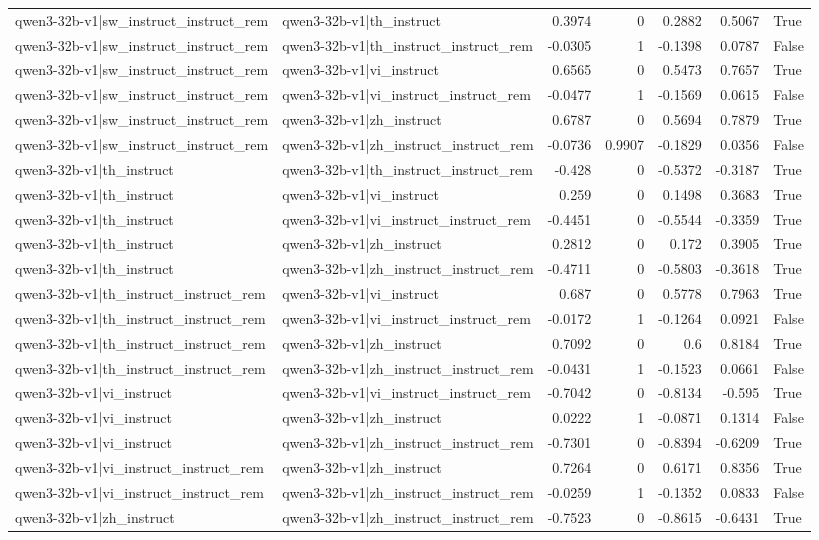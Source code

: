 \begin{table}
\begin{tabular}{l l r r r r l}
qwen3-32b-v1|sw_instruct_instruct_rem & qwen3-32b-v1|th_instruct & 0.3974 & 0 & 0.2882 & 0.5067 & True \\
qwen3-32b-v1|sw_instruct_instruct_rem & qwen3-32b-v1|th_instruct_instruct_rem & -0.0305 & 1 & -0.1398 & 0.0787 & False \\
qwen3-32b-v1|sw_instruct_instruct_rem & qwen3-32b-v1|vi_instruct & 0.6565 & 0 & 0.5473 & 0.7657 & True \\
qwen3-32b-v1|sw_instruct_instruct_rem & qwen3-32b-v1|vi_instruct_instruct_rem & -0.0477 & 1 & -0.1569 & 0.0615 & False \\
qwen3-32b-v1|sw_instruct_instruct_rem & qwen3-32b-v1|zh_instruct & 0.6787 & 0 & 0.5694 & 0.7879 & True \\
qwen3-32b-v1|sw_instruct_instruct_rem & qwen3-32b-v1|zh_instruct_instruct_rem & -0.0736 & 0.9907 & -0.1829 & 0.0356 & False \\
qwen3-32b-v1|th_instruct & qwen3-32b-v1|th_instruct_instruct_rem & -0.428 & 0 & -0.5372 & -0.3187 & True \\
qwen3-32b-v1|th_instruct & qwen3-32b-v1|vi_instruct & 0.259 & 0 & 0.1498 & 0.3683 & True \\
qwen3-32b-v1|th_instruct & qwen3-32b-v1|vi_instruct_instruct_rem & -0.4451 & 0 & -0.5544 & -0.3359 & True \\
qwen3-32b-v1|th_instruct & qwen3-32b-v1|zh_instruct & 0.2812 & 0 & 0.172 & 0.3905 & True \\
qwen3-32b-v1|th_instruct & qwen3-32b-v1|zh_instruct_instruct_rem & -0.4711 & 0 & -0.5803 & -0.3618 & True \\
qwen3-32b-v1|th_instruct_instruct_rem & qwen3-32b-v1|vi_instruct & 0.687 & 0 & 0.5778 & 0.7963 & True \\
qwen3-32b-v1|th_instruct_instruct_rem & qwen3-32b-v1|vi_instruct_instruct_rem & -0.0172 & 1 & -0.1264 & 0.0921 & False \\
qwen3-32b-v1|th_instruct_instruct_rem & qwen3-32b-v1|zh_instruct & 0.7092 & 0 & 0.6 & 0.8184 & True \\
qwen3-32b-v1|th_instruct_instruct_rem & qwen3-32b-v1|zh_instruct_instruct_rem & -0.0431 & 1 & -0.1523 & 0.0661 & False \\
qwen3-32b-v1|vi_instruct & qwen3-32b-v1|vi_instruct_instruct_rem & -0.7042 & 0 & -0.8134 & -0.595 & True \\
qwen3-32b-v1|vi_instruct & qwen3-32b-v1|zh_instruct & 0.0222 & 1 & -0.0871 & 0.1314 & False \\
qwen3-32b-v1|vi_instruct & qwen3-32b-v1|zh_instruct_instruct_rem & -0.7301 & 0 & -0.8394 & -0.6209 & True \\
qwen3-32b-v1|vi_instruct_instruct_rem & qwen3-32b-v1|zh_instruct & 0.7264 & 0 & 0.6171 & 0.8356 & True \\
qwen3-32b-v1|vi_instruct_instruct_rem & qwen3-32b-v1|zh_instruct_instruct_rem & -0.0259 & 1 & -0.1352 & 0.0833 & False \\
qwen3-32b-v1|zh_instruct & qwen3-32b-v1|zh_instruct_instruct_rem & -0.7523 & 0 & -0.8615 & -0.6431 & True \\
\bottomrule
\end{tabular}
\end{table}
